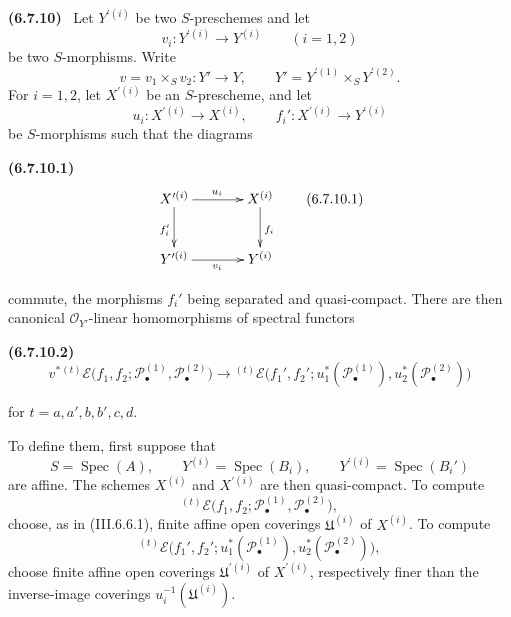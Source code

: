 \documentclass[10pt,oneside]{book}
\newcommand{\sh}[1]{\mathscr{#1}}
\newcommand{\Spec}{\operatorname{Spec}}
\newcommand{\sref}[2][]{(#2)}
\newcommand{\oldpage}[2][]{\setcounter{footnote}{0}\marginpar{\scriptsize\textbf{#1}~|~#2}\ignorespaces}
\newenvironment{env}[1][]{\par\medskip\noindent\textbf{(#1)}\ }{\par}
\begin{document}
\begin{env}[6.7.10]
\label{III.6.7.10}
Let $Y^{\prime(i)}$ be two $S$-preschemes and let
\[
  v_i:Y^{\prime(i)}\longrightarrow Y^{(i)}
  \qquad (i=1,2)
\]
be two $S$-morphisms.  Write
\[
  v=v_1\times_Sv_2:Y'\longrightarrow Y,
  \qquad
  Y'=Y^{\prime(1)}\times_SY^{\prime(2)}.
\]
For $i=1,2$, let $X^{\prime(i)}$ be an $S$-prescheme, and let
\[
  u_i:X^{\prime(i)}\longrightarrow X^{(i)},
  \qquad
  f_i':X^{\prime(i)}\longrightarrow Y^{\prime(i)}
\]
be $S$-morphisms such that the diagrams
\begin{env}[6.7.10.1]
\label{III.6.7.10.1}
\[
\xymatrix@C=36pt@R=28pt{
  X^{\prime(i)} \ar[r]^{u_i}\ar[d]_{f_i'}
  & X^{(i)}\ar[d]^{f_i}
  \\
  Y^{\prime(i)} \ar[r]_{v_i}
  & Y^{(i)}
}
\tag{6.7.10.1}\label{III.6.7.10.1.eq}
\]
\end{env}
commute, the morphisms $f_i'$ being separated and quasi-compact.
There are then canonical $\sh O_{Y'}$-linear homomorphisms of
spectral functors
\begin{env}[6.7.10.2]
\label{III.6.7.10.2}
\[
  v^*
  {}^{(t)}\sh E
  \bigl(
    f_1,f_2;
    \sh P_\bullet^{(1)},\sh P_\bullet^{(2)}
  \bigr)
  \longrightarrow
  {}^{(t)}\sh E
  \bigl(
    f_1',f_2';
    u_1^*(\sh P_\bullet^{(1)}),
    u_2^*(\sh P_\bullet^{(2)})
  \bigr)
  \tag{6.7.10.2}\label{III.6.7.10.2.eq}
\]
\end{env}
for $t=a,a',b,b',c,d$.

To define them, first suppose that
\[
  S=\Spec(A),\qquad
  Y^{(i)}=\Spec(B_i),\qquad
  Y^{\prime(i)}=\Spec(B_i')
\]
are affine.  The schemes $X^{(i)}$ and $X^{\prime(i)}$ are then
quasi-compact.  To compute
\[
  {}^{(t)}\sh E
  \bigl(
    f_1,f_2;
    \sh P_\bullet^{(1)},\sh P_\bullet^{(2)}
  \bigr),
\]
choose, as in \sref{III.6.6.1}, finite affine open coverings
$\mathfrak U^{(i)}$ of $X^{(i)}$.  To compute
\[
  {}^{(t)}\sh E
  \bigl(
    f_1',f_2';
    u_1^*(\sh P_\bullet^{(1)}),
    u_2^*(\sh P_\bullet^{(2)})
  \bigr),
\]
choose finite affine open coverings $\mathfrak U^{\prime(i)}$ of
$X^{\prime(i)}$, respectively finer than the inverse-image
coverings $u_i^{-1}(\mathfrak U^{(i)})$.

\oldpage[III]{163}


\end{env}
\end{document}
